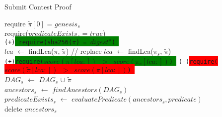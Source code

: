 \begin{algorithm}
    \caption{Submit Contest Proof}
    \label{algo:hash_and_resubmit_contest}
    require $\tilde\pi[0]$ = $genesis_{s}$ \\
    require($predicateExists_{s}$ = $true$) \\
    \texttt{(+)\colorbox{green}{\textrm{
        require(sha256($\pi$) = $digest^{\pi}$)
        }}}\\
    \textrm{$lca$ $\leftarrow$ findLca($\pi$, $\tilde\pi$)
        }%
    // replace \textrm{$lca$ $\leftarrow$ findLca($\pi_{s}$, $\tilde\pi$)
        }\\
    \texttt{(+)\colorbox{green}{\textrm{require($score(\tilde\pi[lca:])$ $>$ $score(\pi_{s}[lca:])$)
        }}}%
    \texttt{(-)\colorbox{red}{\textrm{require($score(\tilde\pi[lca:])$ $>$ $score(\pi[lca:])$)
        }}}\\
    $DAG_{s}$ $\leftarrow$ $DAG_{s}$ $\cup$ $\tilde\pi$\\
    $ancestors_{s}$ $\leftarrow$ $findAncestors(DAG_{s})$\\
    $predicateExists_{s}$ $\leftarrow$ $evaluatePredicate(ancestors_{s}, predicate)$\\
    delete $ancestors_{s}$\\
\end{algorithm}

